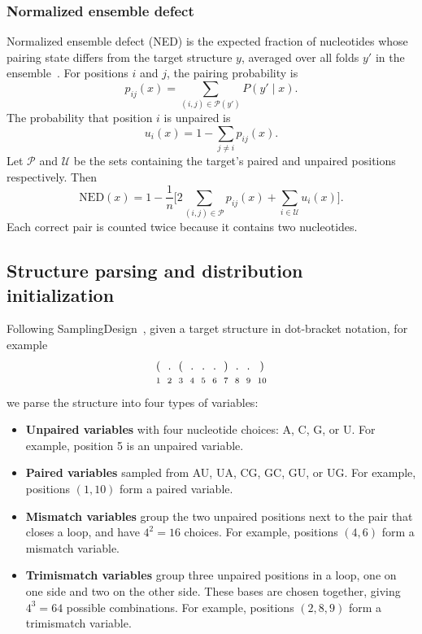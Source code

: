 \subsubsection{Normalized ensemble defect}
Normalized ensemble defect (NED) is the expected fraction of nucleotides whose pairing state
differs from the target structure $y$, averaged over all folds $y'$ in the
ensemble~\citep{dirks2004,zadeh2011}. For positions $i$ and $j$, the pairing probability is
\begin{equation}
 p_{ij}(x)=\sum_{(i,j)\in\mathcal{P}(y')}P(y'\mid x).
\end{equation}
The probability that position $i$ is unpaired is
\begin{equation}
 u_i(x)=1-\sum_{j\ne i}p_{ij}(x).
\end{equation}
Let $\mathcal{P}$ and $\mathcal{U}$ be the sets containing the target's paired and unpaired positions respectively. Then
{\small
\begin{equation}
 \mathrm{NED}(x)=1-\frac{1}{n}\biggl[
 2\textstyle\sum_{(i,j)\in\mathcal{P}}p_{ij}(x)
 +\textstyle\sum_{i\in\mathcal{U}}u_i(x)\biggr].
 \label{eq:ned}
\end{equation}
}
Each correct pair is counted twice because it contains two nucleotides.

\subsection{Structure parsing and distribution initialization}
Following SamplingDesign~\citep{tang2026}, given a target structure in dot-bracket notation, for example
\[
\setlength{\arraycolsep}{3pt}
\begin{array}{cccccccccc}
 ( & . & ( & . & . & . & ) & . & . & )\\
 \scriptstyle 1 & \scriptstyle 2 & \scriptstyle 3 &
 \scriptstyle 4 & \scriptstyle 5 & \scriptstyle 6 &
 \scriptstyle 7 & \scriptstyle 8 & \scriptstyle 9 &
 \scriptstyle 10
\end{array}
\]
we parse the structure into four types of variables:
\begin{itemize}
\item \textbf{Unpaired variables} with four nucleotide choices: A, C, G, or U.
  For example, position 5 is an unpaired variable.
\item \textbf{Paired variables} sampled from {AU, UA, CG, GC, GU, or UG}.
  For example, positions $(1,10)$ form a paired variable.
\item \textbf{Mismatch variables} group the two unpaired positions next to the pair that closes
  a loop, and have $4^2=16$ choices. For example, positions $(4,6)$ form a mismatch variable.
\item \textbf{Trimismatch variables} group three unpaired positions in a loop, one on one side
  and two on the other side. These bases are chosen together,
  giving $4^3=64$ possible combinations. For example, positions $(2,8,9)$ form a trimismatch variable.
\end{itemize}

